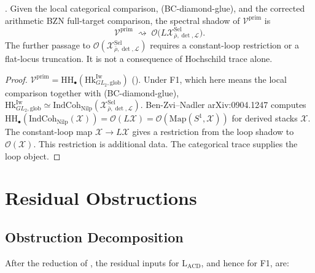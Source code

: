 \begin{corollary}
\label{v4-arith:acd:cor:V-prim-spectral}
\ClaimStatusNeedsVerification. Given the local categorical comparison,
(BC-diamond-glue), and the corrected arithmetic BZN full-target
comparison, the spectral shadow of \(\mathcal{V}^{\mathrm{prim}}\) is
\begin{equation}
\mathcal{V}^{\mathrm{prim}}\;\rightsquigarrow\;
\mathcal{O}\bigl(L\mathcal{X}^{\mathrm{Sel}}_{\bar\rho,\det,\mathcal{L}}\bigr).
\end{equation}
The further passage to
\(\mathcal{O}(\mathcal{X}^{\mathrm{Sel}}_{\bar\rho,\det,\mathcal{L}})\)
requires a constant-loop restriction or a flat-locus truncation. It is
not a consequence of Hochschild trace alone.
\end{corollary}

\begin{proof}
\(\mathcal{V}^{\mathrm{prim}}=\mathrm{HH}_{\bullet}(\mathrm{Hk}^{\mathrm{Iw}}_{GL_{2},\mathrm{glob}})\)
(). Under F1, which here means
the local comparison together with (BC-diamond-glue),
\(\mathrm{Hk}^{\mathrm{Iw}}_{GL_{2},\mathrm{glob}}\simeq\mathrm{IndCoh}_{\mathrm{Nilp}}(\mathcal{X}^{\mathrm{Sel}}_{\bar\rho,\det,\mathcal{L}})\).
Ben-Zvi--Nadler arXiv:0904.1247 computes
\(\mathrm{HH}_{\bullet}(\mathrm{IndCoh}_{\mathrm{Nilp}}(\mathcal{X}))=\mathcal{O}(L\mathcal{X})=\mathcal{O}(\mathrm{Map}(S^{1},\mathcal{X}))\)
for derived stacks \(\mathcal{X}\). The constant-loop map
\(\mathcal{X}\to L\mathcal{X}\) gives a restriction from the loop
shadow to \(\mathcal{O}(\mathcal{X})\).  This restriction is additional
data.  The categorical trace supplies the loop object.
\end{proof}

\section{Residual Obstructions}
\label{v4-arith:acd:residuals}

\subsection{Obstruction Decomposition}

After the reduction of , the
residual inputs for \(\mathrm{L}_{\mathrm{ACD}}\), and hence for F1,
are:


